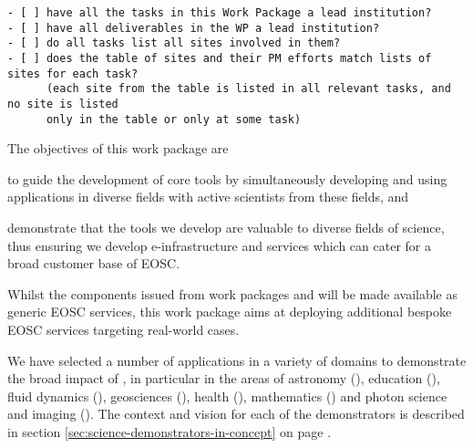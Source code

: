 \begin{draft}
\begin{verbatim}
- [ ] have all the tasks in this Work Package a lead institution?
- [ ] have all deliverables in the WP a lead institution?
- [ ] do all tasks list all sites involved in them?
- [ ] does the table of sites and their PM efforts match lists of sites for each task?
      (each site from the table is listed in all relevant tasks, and no site is listed
      only in the table or only at some task)
\end{verbatim}
\end{draft}

\begin{workpackage}[id=applications,wphases=0-48,swsites,
  title=Science demonstrators,
  short=Demonstrators,
  lead=XFEL,
  EGIRM=7,
  CDSRM=12,
  INSERMRM=24,
  QSRM=6,
  SILRM=12,
  SRLRM=9,
  UIORM=12,
  UPSUDRM=20,
  WTTRM=3,
  XFELRM=36,
  EPRM=3,
]
\begin{wpobjectives}
  The objectives of this work package are
 \begin{compactitem}
   \item to guide the development of core tools by simultaneously
     developing and using applications in diverse fields with active
     scientists from these fields, and
   \item demonstrate that the tools we develop are valuable to diverse
     fields of science, thus ensuring we develop e-infrastructure and
     services which can cater for a broad customer base of EOSC.
 \end{compactitem}
\end{wpobjectives}

\begin{wpdescription}

  Whilst the components issued from work packages   and  will be
  made available as generic EOSC services, this work package aims at deploying additional bespoke EOSC services
  targeting real-world cases.

  We have selected a number of applications in a variety of domains
  to demonstrate the broad impact of \TheProject, in particular in the
  areas of astronomy
  (), education
  (), fluid dynamics
  (), geosciences
  (), health
  (), mathematics
  () and photon science and imaging
  ().
  The context and vision for each of the demonstrators is described in
  section \ref{sec:science-demonstrators-in-concept} on page
  \pageref{sec:science-demonstrators-in-concept}.


\end{wpdescription}
\end{workpackage}
